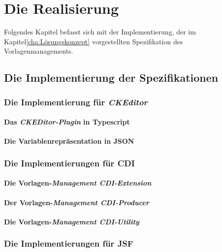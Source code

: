\chapter{Die Realisierung}
\label{cha:Realisierung}
Folgendes Kapitel befasst sich mit der Implementierung, der im Kapitel\ref{cha:Lösungskonzept} vorgestellten Spezifikation des Vorlagenmanagements. 
\section{Die Implementierung der Spezifikationen}

\subsection{Die Implementierung für \emph{CKEditor}}

\subsubsection{Das \emph{CKEDitor-Plugin} in Typescript}

\subsubsection{Die Variablenrepräsentation in JSON}


\subsection{Die Implementierungen für CDI}

\subsubsection{Die Vorlagen-\emph{Management CDI-Extension}}

\subsubsection{Der Vorlagen-\emph{Management CDI-Producer}}

\subsubsection{Die Vorlagen-\emph{Management CDI-Utility}}


\subsection{Die Implementierungen für JSF}


